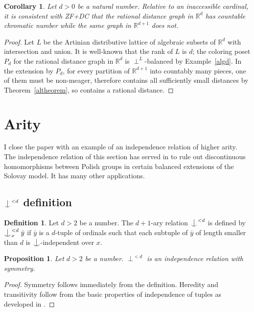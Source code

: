 \documentclass{article}
\newcommand{\forkindep}[1][]{%
  \mathrel{
    \mathop{
      \vcenter{
        \hbox{\oalign{\noalign{\kern-.3ex}\hfil$\vert$\hfil\cr
              \noalign{\kern-.7ex}
              $\smile$\cr\noalign{\kern-.3ex}}}
      }
    }\displaylimits_{#1}
  }
}
\newtheorem{corollary}[theorem]{Corollary}
\newtheorem{proposition}[theorem]{Proposition}
\theoremstyle{definition}
\newtheorem{definition}[theorem]{Definition}
\begin{document}
\begin{corollary}
Let $d>0$ be a natural number. Relative to an inaccessible cardinal, it is consistent with ZF+DC that the rational distance graph in $\mathbb{R}^d$ has countable chromatic number while the same graph in $\mathbb{R}^{d+1}$ does not.
\end{corollary}

\begin{proof}
Let $L$ be the Artinian distributive lattice of algebraic subsets of $\mathbb{R}^d$ with intersection and union. It is well-known that the rank of $L$ is $d$; the coloring poset $P_d$ for the rational distance graph in $\mathbb{R}^d$ is $\perp^L$-balanced by Example~\ref{algd}. In the extension by $P_d$, for every partition of $\mathbb{R}^{d+1}$ into countably many pieces, one of them must be non-meager, therefore contains all sufficiently small distances by Theorem~\ref{altheorem}, so contains a rational distance.
\end{proof}


\section{Arity}

I close the paper with an example of an independence relation of higher arity. The independence relation of this section has served in \cite[Chapter 13]{z:geometric} to rule out discontinuous homomorphisms between Polish groups in certain balanced extensions of the Solovay model. It has many other applications.

\subsection{$\forkindep^{<d}$ definition}

\begin{definition}
Let $d>2$ be a number. The $d+1$-ary relation $\forkindep^{<d}$ is defined by $\forkindep_x^{<d}\bar y$ if $\bar y$ is a $d$-tuple of ordinals such that each subtuple of $\bar y$ of length smaller than $d$ is $\forkindep$-independent over $x$.
\end{definition}

\begin{proposition}
Let $d>2$ be a number. $\perp^{<d}$ is an independence relation with symmetry.
\end{proposition}

\begin{proof}
Symmetry follows immediately from the definition. Heredity and transitivity follow from the basic properties of independence of tuples as developed in \cite{z:reloadedA}.
\end{proof}
\end{document}
